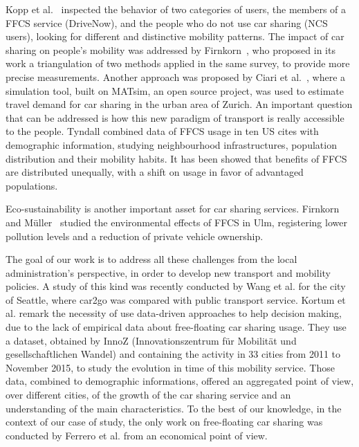 Kopp et al.~\cite{Kopp2015} inspected the behavior of two categories of users, the members of a FFCS service (DriveNow), and the people who do not use car sharing (NCS users), looking for different and distinctive mobility patterns.
The impact of car sharing on people's mobility was addressed by Firnkorn~\cite{Firnkorn2012}, who proposed in its work a triangulation of two methods applied in the same survey, to provide more precise measurements.
Another approach was proposed by Ciari et al.~\cite{Ciari2013}, where a simulation tool, built on MATsim, an open source project, was used to estimate travel demand for car sharing in the urban area of Zurich.
An important question that can be addressed is how this new paradigm of transport is really accessible to the people. Tyndall \cite{Tyndall2016} combined data of FFCS usage in ten US cites with demographic information, studying neighbourhood infrastructures, population distribution and their mobility habits. It has been showed that  benefits of FFCS are distributed unequally, with a shift on usage in favor of advantaged populations.

Eco-sustainability is another important asset for car sharing services. Firnkorn and Müller~\cite{Firnkorn2011} studied the environmental effects of FFCS in Ulm, registering lower pollution levels and a reduction of private vehicle ownership.

The goal of our work is to address all these challenges from the local administration's perspective, in order to develop new transport and mobility policies.
A study of this kind was recently conducted by Wang et al. \cite{Wang2017} for the city of Seattle, where car2go was compared with public transport service.
Kortum et al. \cite{Kortum2016} remark the necessity of use data-driven approaches to help decision making, due to the lack of empirical data about free-floating car sharing usage. 
They use a dataset, obtained by InnoZ (Innovationszentrum für Mobilität und gesellschaftlichen Wandel) and containing the activity in 33 cities from 2011 to November 2015, to study the evolution in time of this mobility service. Those data, combined to demographic informations, offered an aggregated point of view, over different cities, of the growth of the car sharing service and an understanding of the main characteristics.
To the best of our knowledge, in the context of our case of study, the only work on free-floating car sharing was conducted by Ferrero et al. \cite{Ferrero2016} from an economical point of view.

